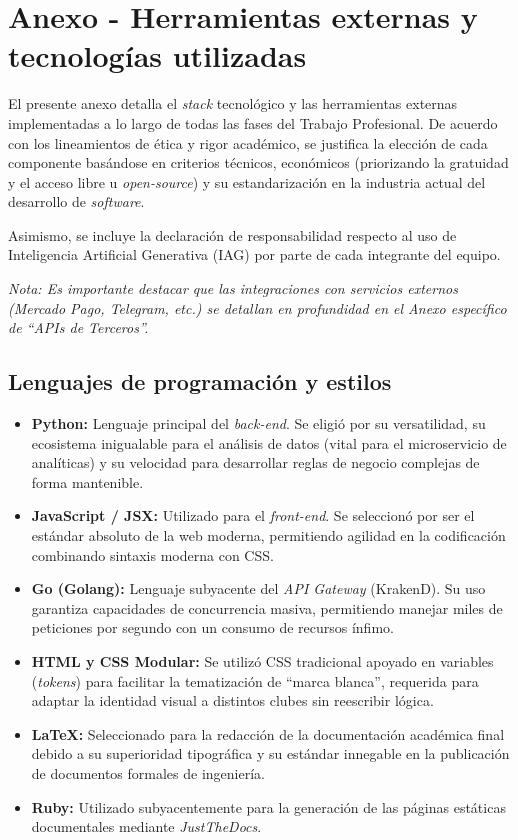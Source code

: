\section{Anexo - Herramientas externas y tecnologías utilizadas}

El presente anexo detalla el \textit{stack} tecnológico y las herramientas externas implementadas a lo largo de todas las fases del Trabajo Profesional. De acuerdo con los lineamientos de ética y rigor académico, se justifica la elección de cada componente basándose en criterios técnicos, económicos (priorizando la gratuidad y el acceso libre u \textit{open-source}) y su estandarización en la industria actual del desarrollo de \textit{software}.

Asimismo, se incluye la declaración de responsabilidad respecto al uso de Inteligencia Artificial Generativa (IAG) por parte de cada integrante del equipo.

\textit{Nota: Es importante destacar que las integraciones con servicios externos (Mercado Pago, Telegram, etc.) se detallan en profundidad en el Anexo específico de ``APIs de Terceros''.}

\subsection{Lenguajes de programación y estilos}

\begin{itemize}
    \item \textbf{Python:} Lenguaje principal del \textit{back-end}. Se eligió por su versatilidad, su ecosistema inigualable para el análisis de datos (vital para el microservicio de analíticas) y su velocidad para desarrollar reglas de negocio complejas de forma mantenible.
    \item \textbf{JavaScript / JSX:} Utilizado para el \textit{front-end}. Se seleccionó por ser el estándar absoluto de la web moderna, permitiendo agilidad en la codificación combinando sintaxis moderna con CSS.
    \item \textbf{Go (Golang):} Lenguaje subyacente del \textit{API Gateway} (KrakenD). Su uso garantiza capacidades de concurrencia masiva, permitiendo manejar miles de peticiones por segundo con un consumo de recursos ínfimo.
    \item \textbf{HTML y CSS Modular:} Se utilizó CSS tradicional apoyado en variables (\textit{tokens}) para facilitar la tematización de ``marca blanca'', requerida para adaptar la identidad visual a distintos clubes sin reescribir lógica.
    \item \textbf{LaTeX:} Seleccionado para la redacción de la documentación académica final debido a su superioridad tipográfica y su estándar innegable en la publicación de documentos formales de ingeniería.
    \item \textbf{Ruby:} Utilizado subyacentemente para la generación de las páginas estáticas documentales mediante \textit{JustTheDocs}.
\end{itemize}

